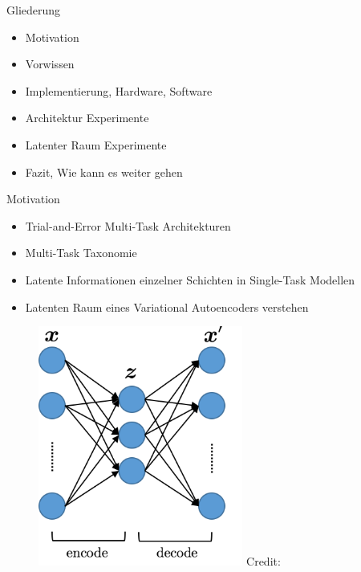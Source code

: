 \begin{frame}{Gliederung}
	\begin{itemize}
		\item Motivation
		\item Vorwissen
		\item Implementierung, Hardware, Software
		\item Architektur Experimente
		\item Latenter Raum Experimente
		\item Fazit, Wie kann es weiter gehen
	\end{itemize}
\end{frame}

\begin{frame}{Motivation}
	\begin{itemize}
		\item Trial-and-Error Multi-Task Architekturen
		\item Multi-Task Taxonomie
		\item Latente Informationen einzelner Schichten in Single-Task Modellen
		\item Latenten Raum eines Variational Autoencoders verstehen
	\end{itemize}
\end{frame}

\begin{frame}
	\begin{figure}
		\includegraphics[width=0.6\textwidth]{images/figures/presentation/autoencoder.png}
		\vspace*{15pt}\hbox{\scriptsize Credit:}
	\end{figure}
\end{frame}


